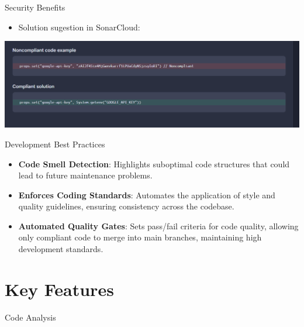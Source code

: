 \documentclass{beamer}
\begin{document}
\begin{frame}{Security Benefits}
  \begin{itemize}
    \item Solution sugestion in SonarCloud: 
  \end{itemize}
  \vspace*{2em}
  \includegraphics[width=1.04\textwidth]{fig/api-security-2.PNG}
\end{frame}

\begin{frame}{Development Best Practices}
  \begin{itemize}
    \item \textbf{Code Smell Detection}: Highlights suboptimal code structures that could lead to future maintenance problems.
    \vspace*{0.75em}
    \item \textbf{Enforces Coding Standards}: Automates the application of style and quality guidelines, ensuring consistency across the codebase.
    \vspace*{0.75em}
    \item \textbf{Automated Quality Gates}: Sets pass/fail criteria for code quality, allowing only compliant code to merge into main branches, maintaining high development standards.
  \end{itemize}
\end{frame}


\section[Key Features]{Key Features}

\begin{frame}{Code Analysis}
\end{frame}
\end{document}
